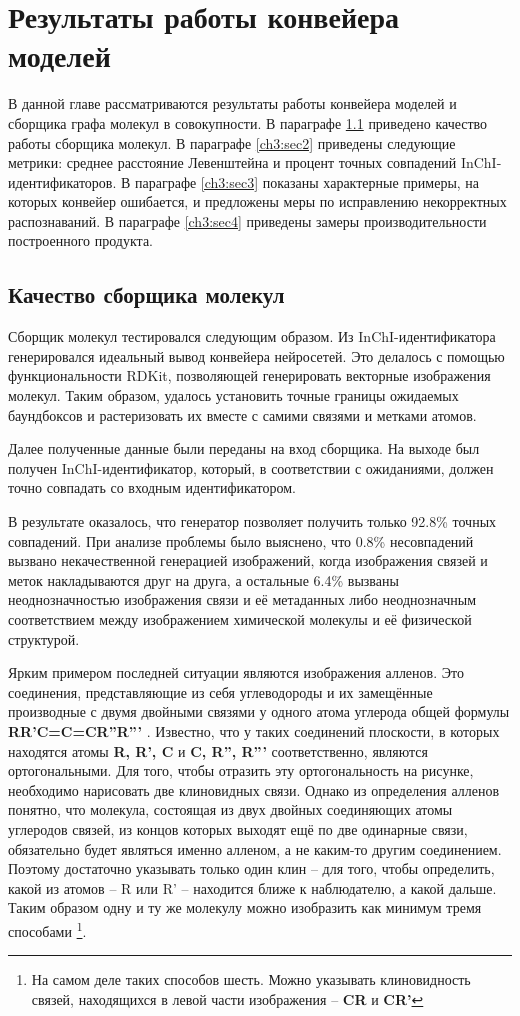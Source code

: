 \chapter{Результаты работы конвейера моделей} \label{ch3}

В данной главе рассматриваются результаты работы конвейера моделей и сборщика графа молекул в совокупности. В параграфе \ref{ch3:sec1} приведено качество работы сборщика молекул. В параграфе \ref{ch3:sec2} приведены следующие метрики: среднее расстояние Левенштейна и процент точных совпадений InChI-идентификаторов. В параграфе \ref{ch3:sec3} показаны характерные примеры, на которых конвейер ошибается, и предложены меры по исправлению некорректных распознаваний. В параграфе \ref{ch3:sec4} приведены замеры производительности построенного продукта.

\section{Качество сборщика молекул} \label{ch3:sec1}

Сборщик молекул тестировался следующим образом. Из InChI-идентификатора генерировался идеальный вывод конвейера нейросетей. 
Это делалось с помощью функциональности RDKit, позволяющей генерировать векторные изображения молекул. Таким образом, удалось установить точные границы ожидаемых баундбоксов и растеризовать их вместе с самими связями и метками атомов.

Далее полученные данные были переданы на вход сборщика. На выходе был получен InChI-идентификатор, который, в соответствии с ожиданиями, должен точно совпадать со входным идентификатором.

В результате оказалось, что генератор позволяет получить только 92.8\% точных совпадений. При анализе проблемы было выяснено, что 0.8\% несовпадений вызвано некачественной генерацией изображений, когда изображения связей и меток накладываются друг на друга, а остальные 6.4\% вызваны неоднозначностью изображения связи и её метаданных либо неоднозначным соответствием между изображением химической молекулы и её физической структурой.

Ярким примером последней ситуации являются изображения алленов. Это соединения, представляющие из себя углеводороды и их замещённые производные с двумя двойными связями у одного атома углерода общей формулы \textbf{RR'C=C=CR''R'''} \cite{allenes}. Известно, что у таких соединений плоскости, в которых находятся атомы \textbf{R, R', C} и \textbf{C, R'', R'''} соответственно, являются ортогональными. Для того, чтобы отразить эту ортогональность на рисунке, необходимо нарисовать две клиновидных связи. Однако из определения алленов понятно, что молекула, состоящая из двух двойных соединяющих атомы углеродов связей, из концов которых выходят ещё по две одинарные связи, обязательно будет являться именно алленом, а не каким-то другим соединением. Поэтому достаточно указывать только один клин -- для того, чтобы определить, какой из атомов -- R или R'  -- находится ближе к наблюдателю, а какой дальше. Таким образом одну и ту же молекулу можно изобразить как минимум тремя способами \footnote{На самом деле таких способов шесть. Можно указывать клиновидность связей, находящихся в левой части изображения -- \textbf{CR} и \textbf{CR'}}.

